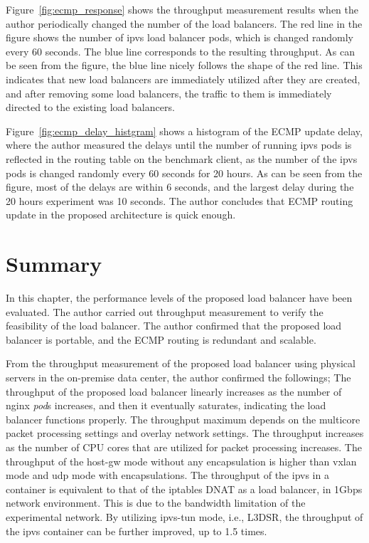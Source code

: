 Figure~\ref{fig:ecmp_response} shows the throughput measurement results when the author periodically changed the number of the load balancers. 
The red line in the figure shows the number of ipvs load balancer pods, which is changed randomly every 60 seconds.
The blue line corresponds to the resulting throughput.
As can be seen from the figure, the blue line nicely follows the shape of the red line.
This indicates that new load balancers are immediately utilized after they are created, and after removing some load balancers, the traffic to them is immediately directed to the existing load balancers.

Figure~\ref{fig:ecmp_delay_histgram} shows a histogram of the ECMP update delay, where the author measured the delays until the number of running ipvs pods is reflected in the routing table on the benchmark client, as the number of the ipvs pods is changed randomly every 60 seconds for 20 hours.
As can be seen from the figure, most of the delays are within 6 seconds, and the largest delay during the 20 hours experiment was 10 seconds.
The author concludes that ECMP routing update in the proposed architecture is quick enough.

\FloatBarrier

\section{Summary}\label{Conclusions}

In this chapter, the performance levels of the proposed load balancer have been evaluated. 
The author carried out throughput measurement to verify the feasibility of the load balancer.
The author confirmed that the proposed load balancer is portable, and the ECMP routing is redundant and scalable.

From the throughput measurement of the proposed load balancer using physical servers in the on-premise data center, the author confirmed the followings;
The throughput of the proposed load balancer linearly increases as the number of nginx {\em pod}s increases, and then it eventually saturates, indicating the load balancer functions properly.
The throughput maximum depends on the multicore packet processing settings and overlay network settings.
The throughput increases as the number of CPU cores that are utilized for packet processing increases.
The throughput of the host-gw mode without any encapsulation is higher than vxlan mode and udp mode with encapsulations.
The throughput of the ipvs in a container is equivalent to that of the iptables DNAT as a load balancer, in 1Gbps network environment.
This is due to the bandwidth limitation of the experimental network.
By utilizing ipvs-tun mode, i.e., L3DSR, the throughput of the ipvs container can be further improved, up to 1.5 times.

